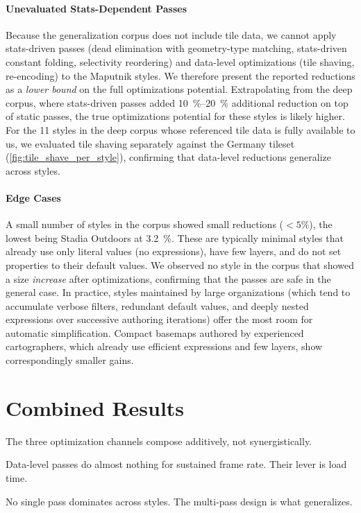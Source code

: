 \paragraph{Unevaluated Stats-Dependent Passes}
Because the generalization corpus does not include tile data, we cannot apply stats-driven passes (dead elimination with geometry-type matching, stats-driven constant folding, selectivity reordering) and data-level optimizations (tile shaving, re-encoding) to the Maputnik styles.
We therefore present the reported reductions as a \emph{lower bound} on the full optimizations potential.
Extrapolating from the deep corpus, where stats-driven passes added \qtyrange{10}{20}{\percent} additional reduction on top of static passes, the true optimizations potential for these styles is likely higher.
For the 11 styles in the deep corpus whose referenced tile data is fully available to us, we evaluated tile shaving separately against the Germany tileset (\cref{fig:tile_shave_per_style}), confirming that data-level reductions generalize across styles.

\paragraph{Edge Cases}
A small number of styles in the corpus showed small reductions ($< 5\%$), the lowest being Stadia Outdoors at \qty{3.2}{\percent}.
These are typically minimal styles that already use only literal values (no expressions), have few layers, and do not set properties to their default values.
We observed no style in the corpus that showed a size \emph{increase} after optimizations, confirming that the passes are safe in the general case.
In practice, styles maintained by large organizations (which tend to accumulate verbose filters, redundant default values, and deeply nested expressions over successive authoring iterations) offer the most room for automatic simplification.
Compact basemaps authored by experienced cartographers, which already use efficient expressions and few layers, show correspondingly smaller gains.


\section{Combined Results}\label{sec:exp_combined}
\begin{keytakeaways}
\item The three optimization channels compose additively, not synergistically.
\item Data-level passes do almost nothing for sustained frame rate.
Their lever is load time.
\item No single pass dominates across styles.
The multi-pass design is what generalizes.
\end{keytakeaways}

